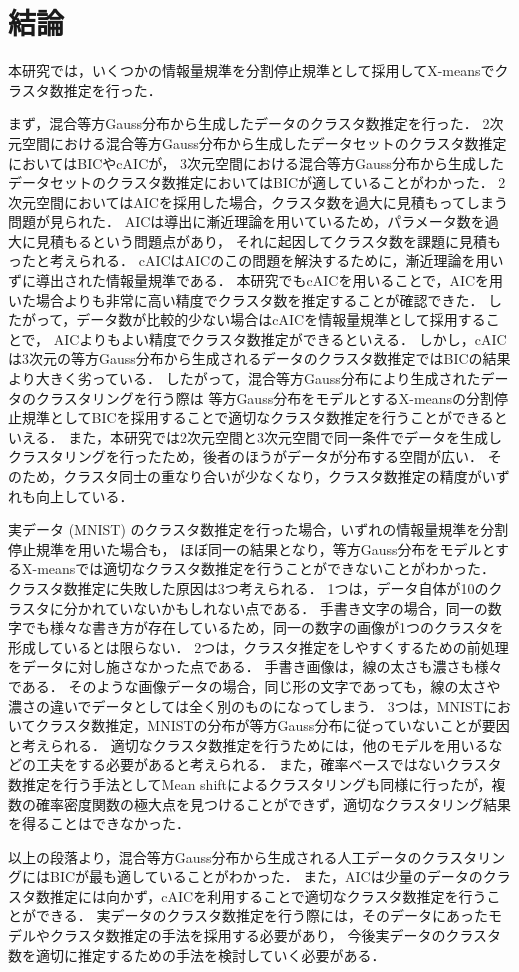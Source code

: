 \section{結論}

本研究では，いくつかの情報量規準を分割停止規準として採用してX-meansでクラスタ数推定を行った．

まず，混合等方Gauss分布から生成したデータのクラスタ数推定を行った．
2次元空間における混合等方Gauss分布から生成したデータセットのクラスタ数推定においてはBICやcAICが，
3次元空間における混合等方Gauss分布から生成したデータセットのクラスタ数推定においてはBICが適していることがわかった．
2次元空間においてはAICを採用した場合，クラスタ数を過大に見積もってしまう問題が見られた．
AICは導出に漸近理論を用いているため，パラメータ数を過大に見積もるという問題点があり，
それに起因してクラスタ数を課題に見積もったと考えられる．
cAICはAICのこの問題を解決するために，漸近理論を用いずに導出された情報量規準である．
本研究でもcAICを用いることで，AICを用いた場合よりも非常に高い精度でクラスタ数を推定することが確認できた．
したがって，データ数が比較的少ない場合はcAICを情報量規準として採用することで，
AICよりもよい精度でクラスタ数推定ができるといえる．
しかし，cAICは3次元の等方Gauss分布から生成されるデータのクラスタ数推定ではBICの結果より大きく劣っている．
したがって，混合等方Gauss分布により生成されたデータのクラスタリングを行う際は
等方Gauss分布をモデルとするX-meansの分割停止規準としてBICを採用することで適切なクラスタ数推定を行うことができるといえる．
また，本研究では2次元空間と3次元空間で同一条件でデータを生成しクラスタリングを行ったため，後者のほうがデータが分布する空間が広い．
そのため，クラスタ同士の重なり合いが少なくなり，クラスタ数推定の精度がいずれも向上している．

実データ (MNIST) のクラスタ数推定を行った場合，いずれの情報量規準を分割停止規準を用いた場合も，
ほぼ同一の結果となり，等方Gauss分布をモデルとするX-meansでは適切なクラスタ数推定を行うことができないことがわかった．
クラスタ数推定に失敗した原因は3つ考えられる．
1つは，データ自体が10のクラスタに分かれていないかもしれない点である．
手書き文字の場合，同一の数字でも様々な書き方が存在しているため，同一の数字の画像が1つのクラスタを形成しているとは限らない．
2つは，クラスタ推定をしやすくするための前処理をデータに対し施さなかった点である．
手書き画像は，線の太さも濃さも様々である．
そのような画像データの場合，同じ形の文字であっても，線の太さや濃さの違いでデータとしては全く別のものになってしまう．
3つは，MNISTにおいてクラスタ数推定，MNISTの分布が等方Gauss分布に従っていないことが要因と考えられる．
適切なクラスタ数推定を行うためには，他のモデルを用いるなどの工夫をする必要があると考えられる．
また，確率ベースではないクラスタ数推定を行う手法としてMean shiftによるクラスタリングも同様に行ったが，複数の確率密度関数の極大点を見つけることができず，適切なクラスタリング結果を得ることはできなかった．

以上の段落より，混合等方Gauss分布から生成される人工データのクラスタリングにはBICが最も適していることがわかった．
また，AICは少量のデータのクラスタ数推定には向かず，cAICを利用することで適切なクラスタ数推定を行うことができる．
実データのクラスタ数推定を行う際には，そのデータにあったモデルやクラスタ数推定の手法を採用する必要があり，
今後実データのクラスタ数を適切に推定するための手法を検討していく必要がある．
